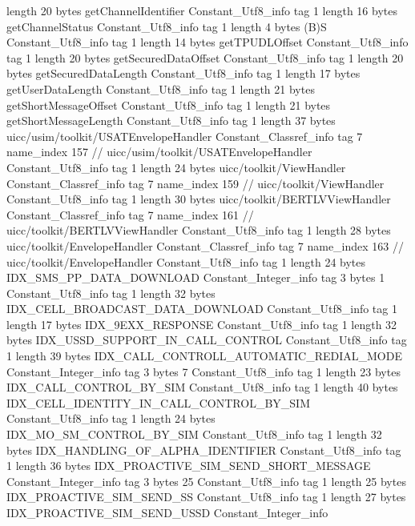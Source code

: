{{{			length	20
			bytes	getChannelIdentifier
		}
		Constant_Utf8_info {
			tag	1
			length	16
			bytes	getChannelStatus
		}
		Constant_Utf8_info {
			tag	1
			length	4
			bytes	(B)S
		}
		Constant_Utf8_info {
			tag	1
			length	14
			bytes	getTPUDLOffset
		}
		Constant_Utf8_info {
			tag	1
			length	20
			bytes	getSecuredDataOffset
		}
		Constant_Utf8_info {
			tag	1
			length	20
			bytes	getSecuredDataLength
		}
		Constant_Utf8_info {
			tag	1
			length	17
			bytes	getUserDataLength
		}
		Constant_Utf8_info {
			tag	1
			length	21
			bytes	getShortMessageOffset
		}
		Constant_Utf8_info {
			tag	1
			length	21
			bytes	getShortMessageLength
		}
		Constant_Utf8_info {
			tag	1
			length	37
			bytes	uicc/usim/toolkit/USATEnvelopeHandler
		}
		Constant_Classref_info {
			tag	7
			name_index	157		// uicc/usim/toolkit/USATEnvelopeHandler
		}
		Constant_Utf8_info {
			tag	1
			length	24
			bytes	uicc/toolkit/ViewHandler
		}
		Constant_Classref_info {
			tag	7
			name_index	159		// uicc/toolkit/ViewHandler
		}
		Constant_Utf8_info {
			tag	1
			length	30
			bytes	uicc/toolkit/BERTLVViewHandler
		}
		Constant_Classref_info {
			tag	7
			name_index	161		// uicc/toolkit/BERTLVViewHandler
		}
		Constant_Utf8_info {
			tag	1
			length	28
			bytes	uicc/toolkit/EnvelopeHandler
		}
		Constant_Classref_info {
			tag	7
			name_index	163		// uicc/toolkit/EnvelopeHandler
		}
		Constant_Utf8_info {
			tag	1
			length	24
			bytes	IDX_SMS_PP_DATA_DOWNLOAD
		}
		Constant_Integer_info {
			tag	3
			bytes	1
		}
		Constant_Utf8_info {
			tag	1
			length	32
			bytes	IDX_CELL_BROADCAST_DATA_DOWNLOAD
		}
		Constant_Utf8_info {
			tag	1
			length	17
			bytes	IDX_9EXX_RESPONSE
		}
		Constant_Utf8_info {
			tag	1
			length	32
			bytes	IDX_USSD_SUPPORT_IN_CALL_CONTROL
		}
		Constant_Utf8_info {
			tag	1
			length	39
			bytes	IDX_CALL_CONTROLL_AUTOMATIC_REDIAL_MODE
		}
		Constant_Integer_info {
			tag	3
			bytes	7
		}
		Constant_Utf8_info {
			tag	1
			length	23
			bytes	IDX_CALL_CONTROL_BY_SIM
		}
		Constant_Utf8_info {
			tag	1
			length	40
			bytes	IDX_CELL_IDENTITY_IN_CALL_CONTROL_BY_SIM
		}
		Constant_Utf8_info {
			tag	1
			length	24
			bytes	IDX_MO_SM_CONTROL_BY_SIM
		}
		Constant_Utf8_info {
			tag	1
			length	32
			bytes	IDX_HANDLING_OF_ALPHA_IDENTIFIER
		}
		Constant_Utf8_info {
			tag	1
			length	36
			bytes	IDX_PROACTIVE_SIM_SEND_SHORT_MESSAGE
		}
		Constant_Integer_info {
			tag	3
			bytes	25
		}
		Constant_Utf8_info {
			tag	1
			length	25
			bytes	IDX_PROACTIVE_SIM_SEND_SS
		}
		Constant_Utf8_info {
			tag	1
			length	27
			bytes	IDX_PROACTIVE_SIM_SEND_USSD
		}
		Constant_Integer_info {
}}}
